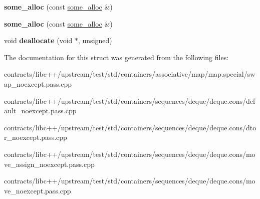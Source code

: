 \begin{DoxyCompactItemize}
\mbox{\label{structsome__alloc_af833435f134a6f8ed9c092586d0e6d2e}} 
{\bfseries some\+\_\+alloc} (const \mbox{\hyperlink{structsome__alloc}{some\+\_\+alloc}} \&)
\item 
\mbox{\label{structsome__alloc_af833435f134a6f8ed9c092586d0e6d2e}} 
{\bfseries some\+\_\+alloc} (const \mbox{\hyperlink{structsome__alloc}{some\+\_\+alloc}} \&)
\item 
\mbox{\label{structsome__alloc_addfc7b0c207a2a66d8b4b005d9e248b7}} 
void {\bfseries deallocate} (void $\ast$, unsigned)
\end{DoxyCompactItemize}


The documentation for this struct was generated from the following files\+:\begin{DoxyCompactItemize}
\item 
contracts/libc++/upstream/test/std/containers/associative/map/map.\+special/swap\+\_\+noexcept.\+pass.\+cpp\item 
contracts/libc++/upstream/test/std/containers/sequences/deque/deque.\+cons/default\+\_\+noexcept.\+pass.\+cpp\item 
contracts/libc++/upstream/test/std/containers/sequences/deque/deque.\+cons/dtor\+\_\+noexcept.\+pass.\+cpp\item 
contracts/libc++/upstream/test/std/containers/sequences/deque/deque.\+cons/move\+\_\+assign\+\_\+noexcept.\+pass.\+cpp\item 
contracts/libc++/upstream/test/std/containers/sequences/deque/deque.\+cons/move\+\_\+noexcept.\+pass.\+cpp\end{DoxyCompactItemize}
